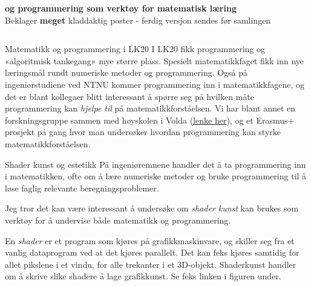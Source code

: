\documentclass[]{beamer}
\begin{document}
\begin{frame}[t]
   \begin{center}
      \huge \textbf{\color{NTNUorange}{Shader-Kunst} \color{NTNUgrey}og programmering som verktøy for matematisk læring}\color{black}
      \vspace{1cm}
      \Large \color{NTNUred} \\Beklager \textbf{meget} kladdaktig poster  - ferdig versjon sendes før samlingen\color{black}
      \noindent\makebox[\linewidth]{\rule{\paperwidth}{0.4pt}}
   \end{center}

   \begin{columns}
      
      \begin{column}{0.33\textwidth}
         \begin{block}{Matematikk og programmering i LK20}
            I LK20 fikk programmering og «algoritmisk tankegang» mye større plass.
            Spesielt matematikkfaget fikk inn nye læringsmål rundt numeriske metoder og programmering.
            Også på ingeniørstudiene ved NTNU kommer programmering inn i matematikkfagene, og det er blant kollegaer blitt interessant å
            spørre seg på hvilken måte programmering kan \textit{hjelpe til} på matematikkforståelsen. Vi har blant annet
            en forskningsgruppe sammen med høyskolen i Volda (\href{https://www.hivolda.no/forsking-og-utvikling-0/forsking-ved-hvo/forskingsgrupper/pedagogikk-og-didaktikk/programmering-matematikkforstaelse}{lenke her}), og
            et Erasmus+ prosjekt på gang hvor man undersøker hvordan programmering kan styrke matematikkforståelsen.
         \end{block}
         \begin{block}{Shader kunst og estetikk}
            På ingeniøremnene handler det å ta programmering inn i matematikken, ofte om å lære numeriske metoder og bruke
            programmering til å løse faglig relevante beregningsproblemer.

            Jeg tror det kan være interessant å undersøke om \textit{shader kunst} kan brukes som verktøy for å undervise både matematikk og programmering.

            En \textit{shader} er et program som kjøres på grafikkmaskinvare, og skiller seg fra et vanlig dataprogram ved at det kjøres parallelt. Det kan feks kjøres samtidig for allet pikslene i et vindu, for alle trekanter i et 3D-objekt.
            Shaderkunst handler om å skrive slike shadere å lage grafikkunst. Se feks linken i figuren under.
            

\end{block}
\end{column}
\end{columns}
\end{frame}
\end{document}
